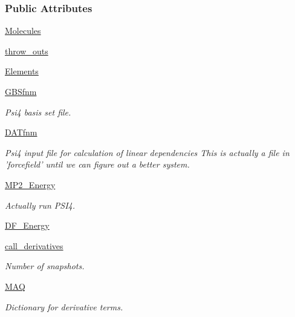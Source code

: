 \subsubsection*{Public Attributes}
\begin{DoxyCompactItemize}
\item 
\hyperlink{classforcebalance_1_1psi4io_1_1THCDF__Psi4_a3f3231f0970970f6ce93c87673728fcd}{Molecules}
\item 
\hyperlink{classforcebalance_1_1psi4io_1_1THCDF__Psi4_a2325dfcc249e17fce558eaff4ed2f7f1}{throw\-\_\-outs}
\item 
\hyperlink{classforcebalance_1_1psi4io_1_1THCDF__Psi4_affc5bc01af54d89e452f324c78d1bc1c}{Elements}
\item 
\hyperlink{classforcebalance_1_1psi4io_1_1THCDF__Psi4_ab406b703826e225ec1e1bb174faf0537}{G\-B\-Sfnm}
\begin{DoxyCompactList}\small\item\em Psi4 basis set file. \end{DoxyCompactList}\item 
\hyperlink{classforcebalance_1_1psi4io_1_1THCDF__Psi4_a939888d130078cd0b36e3e19a9d0585a}{D\-A\-Tfnm}
\begin{DoxyCompactList}\small\item\em Psi4 input file for calculation of linear dependencies This is actually a file in 'forcefield' until we can figure out a better system. \end{DoxyCompactList}\item 
\hyperlink{classforcebalance_1_1psi4io_1_1THCDF__Psi4_a88f28862f46d19b0c36fc22967265715}{M\-P2\-\_\-\-Energy}
\begin{DoxyCompactList}\small\item\em Actually run P\-S\-I4. \end{DoxyCompactList}\item 
\hyperlink{classforcebalance_1_1psi4io_1_1THCDF__Psi4_a5992e04d0a4b8d1e96ad10ec58e7d06a}{D\-F\-\_\-\-Energy}
\item 
\hyperlink{classforcebalance_1_1leastsq_1_1LeastSquares_a58b3039968f72ab1a98e18deed0f8a0a}{call\-\_\-derivatives}
\begin{DoxyCompactList}\small\item\em Number of snapshots. \end{DoxyCompactList}\item 
\hyperlink{classforcebalance_1_1leastsq_1_1LeastSquares_a7f08641f45285414b080f21ed278f31e}{M\-A\-Q}
\begin{DoxyCompactList}\small\item\em Dictionary for derivative terms. \end{DoxyCompactList}\item 

\end{DoxyCompactItemize}
